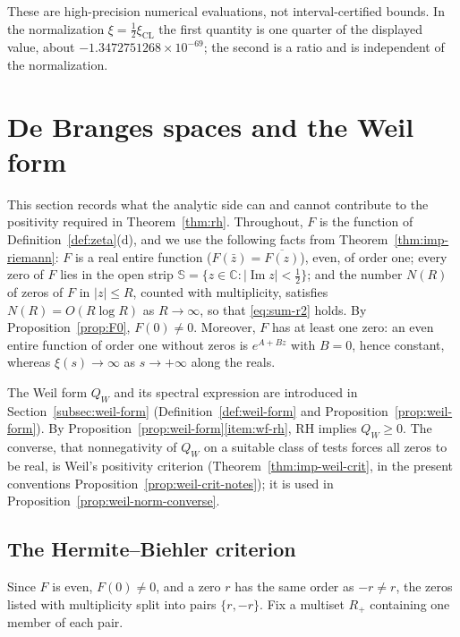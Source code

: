 \documentclass[11pt]{amsart}
\theoremstyle{plain}
\theoremstyle{definition}
\theoremstyle{remark}
\numberwithin{equation}{section}
\newcommand{\C}{\mathbb{C}}
\DeclareMathOperator{\Ima}{Im}
\renewcommand{\Im}{\Ima}
\begin{document}
These are high-precision numerical evaluations, not interval-certified
bounds. In the normalization $\xi=\tfrac12\xi_{\mathrm{CL}}$ the first
quantity is one quarter of the displayed value, about
$-1.3472751268\times10^{-69}$; the second is a ratio and is independent
of the normalization.

\section{De Branges spaces and the Weil form}\label{sec:debranges}

This section records what the analytic side can and cannot contribute
to the positivity required in Theorem~\ref{thm:rh}. Throughout, $F$ is
the function of Definition~\ref{def:zeta}(d), and we use the following
facts from Theorem~\ref{thm:imp-riemann}: $F$ is a real entire function
($F(\bar z)=\overline{F(z)}$), even, of order one; every zero of $F$ lies
in the open strip $\mathbb S=\{z\in\C:|\Im z|<\tfrac12\}$; and the
number $N(R)$ of zeros of $F$ in $|z|\le R$, counted with multiplicity,
satisfies $N(R)=O(R\log R)$ as $R\to\infty$, so that \eqref{eq:sum-r2}
holds. By Proposition~\ref{prop:F0}, $F(0)\ne0$. Moreover, $F$ has at
least one zero: an even entire function of order one without zeros is
$e^{A+Bz}$ with $B=0$, hence constant, whereas $\xi(s)\to\infty$ as
$s\to+\infty$ along the reals.

The Weil form $Q_W$ and its spectral expression are introduced in
Section~\ref{subsec:weil-form} (Definition~\ref{def:weil-form} and
Proposition~\ref{prop:weil-form}). By
Proposition~\ref{prop:weil-form}\ref{item:wf-rh}, RH implies $Q_W\ge0$.
The converse, that nonnegativity of $Q_W$ on a suitable class of tests
forces all zeros to be real, is Weil's positivity criterion
(Theorem~\ref{thm:imp-weil-crit}, in the present conventions
Proposition~\ref{prop:weil-crit-notes}); it is used in
Proposition~\ref{prop:weil-norm-converse}.

\subsection{The Hermite--Biehler criterion}\label{subsec:hb}

Since $F$ is even, $F(0)\ne0$, and a zero $r$ has the same order as
$-r\ne r$, the zeros listed with multiplicity split into pairs
$\{r,-r\}$. Fix a multiset $R_+$ containing one member of each pair.
\end{document}
